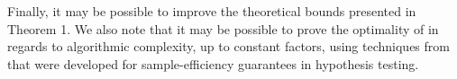 Finally, it may be possible to improve the theoretical bounds presented in Theorem 1. We also note that it may be possible to prove the optimality of \algname in regards to algorithmic complexity, up to constant factors, using techniques from \cite{bagaria2018medoids} that were developed for sample-efficiency guarantees in hypothesis testing.








